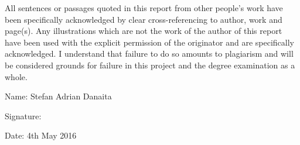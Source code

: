 \begin{declaration}
All sentences or passages quoted in this report from other people's work have been specifically acknowledged by clear cross-referencing to author, work and page(s). Any illustrations which are not the work of the author of this report have been used with the explicit permission of the originator and are specifically acknowledged. I understand that failure to do so amounts to plagiarism and will be considered grounds for failure in this project and the degree examination as a whole.
\vspace{3em}

Name: Stefan Adrian Danaita
\vspace{1em}

Signature:
\vspace{1em}

Date: 4th May 2016
\end{declaration}